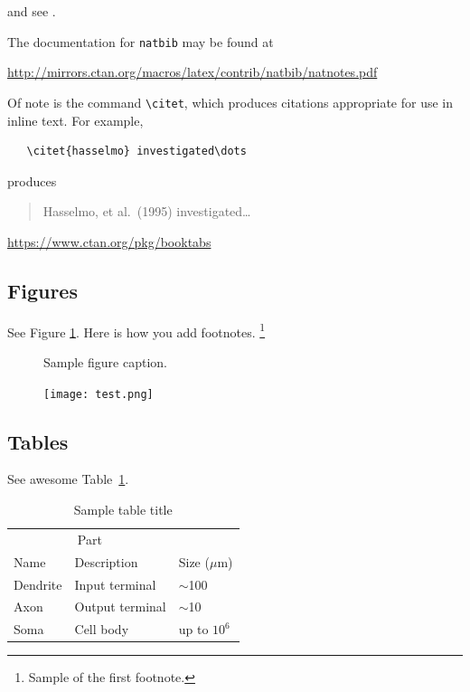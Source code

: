 \documentclass{article}
\begin{document}
\label{sec:others}
\lipsum[8] \cite{kour2014real,kour2014fast} and see \cite{hadash2018estimate}.

The documentation for \verb+natbib+ may be found at
\begin{center}
  \url{http://mirrors.ctan.org/macros/latex/contrib/natbib/natnotes.pdf}
\end{center}
Of note is the command \verb+\citet+, which produces citations
appropriate for use in inline text.  For example,
\begin{verbatim}
   \citet{hasselmo} investigated\dots
\end{verbatim}
produces
\begin{quote}
  Hasselmo, et al.\ (1995) investigated\dots
\end{quote}

\begin{center}
  \url{https://www.ctan.org/pkg/booktabs}
\end{center}


\subsection{Figures}
\lipsum[10] 
See Figure \ref{fig:fig1}. Here is how you add footnotes. \footnote{Sample of the first footnote.}
\lipsum[11] 

\begin{figure}
  \centering
  \fbox{\rule[-.5cm]{4cm}{4cm} \rule[-.5cm]{4cm}{0cm}}
  \caption{Sample figure caption.}
  \label{fig:fig1}
\end{figure}

\begin{figure} %
    \centering
    \texttt{[image: test.png]}
\end{figure}

\subsection{Tables}
\lipsum[12]
See awesome Table~\ref{tab:table}.

\begin{table}
 \caption{Sample table title}
  \centering
  \begin{tabular}{lll}
    \toprule
    \multicolumn{2}{c}{Part}                   \\
    \cmidrule(r){1-2}
    Name     & Description     & Size ($\mu$m) \\
    \midrule
    Dendrite & Input terminal  & $\sim$100     \\
    Axon     & Output terminal & $\sim$10      \\
    Soma     & Cell body       & up to $10^6$  \\
    \bottomrule
  \end{tabular}
  \label{tab:table}
\end{table}
\end{document}
